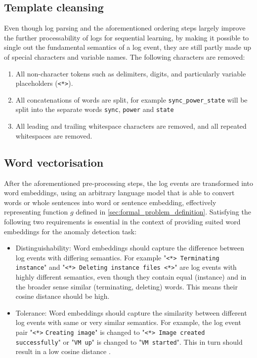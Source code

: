 \subsection{Template cleansing \label{template_cleansing}}
Even though log parsing and the aforementioned ordering steps largely improve the further processability of logs for sequential learning, by making it possible to single out the fundamental semantics of a log event, they are still partly made up of special characters and variable names. The following characters are removed:
\begin{enumerate}
	\item All non-character tokens such as delimiters, digits, and particularly variable placeholders (\verb!<*>!).
	\item All concatenations of words are split, for example \verb!sync_power_state! will be split into the separate words \verb!sync!, \verb!power! and \verb!state!
	\item All leading and trailing whitespace characters are removed, and all repeated whitespaces are removed.
\end{enumerate}

\subsection{Word vectorisation \label{sec:word_vectorization}}
After the aforementioned pre-processing steps, the log events are transformed into word embeddings, using an arbitrary language model that is able to convert words or whole sentences into word or sentence embedding, effectively representing function $g$ defined in \ref{sec:formal_problem_definition}. Satisfying the following two requirements is essential in the context of providing suited word embeddings for the anomaly detection task:
\begin{itemize}
	\item Distinguishability: Word embeddings should capture the difference between log events with differing semantics. For example "\verb!<*> Terminating instance!" and "\verb!<*> Deleting instance files <*>!" are log events with highly different semantics, even though they contain equal (instance) and in the broader sense similar (terminating, deleting) words. This means their cosine distance should be high.
	\item Tolerance: Word embeddings should capture the similarity between different log events with same or very similar semantics. For example, the log event pair "\verb!<*>! \verb!Creating image!" is changed to "\verb!<*> Image created successfully!" or "\verb!VM up!" is changed to "\verb!VM started!". This in turn should result in a low cosine distance \cite{zhang2019robust}.
\end{itemize}




